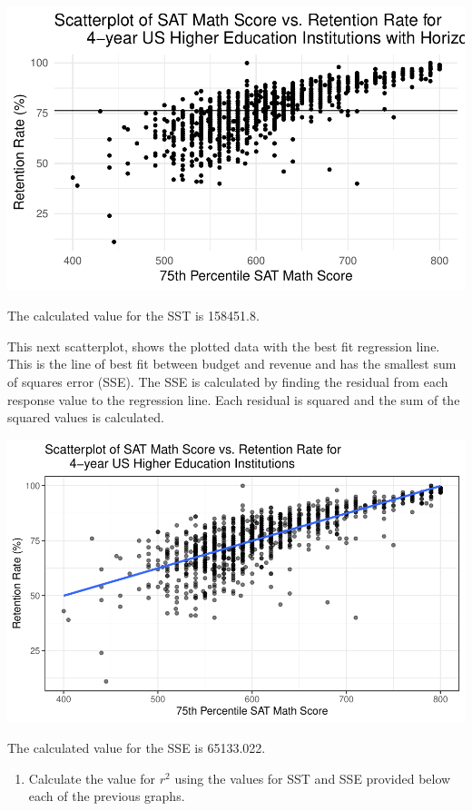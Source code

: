 \documentclass[
]{report}
\providecommand{\tightlist}{%
  \setlength{\itemsep}{0pt}\setlength{\parskip}{0pt}}
\begin{document}
\begin{center}\includegraphics[width=0.7\linewidth]{13-A27-EDA-two-quantitative-corr_files/figure-latex/unnamed-chunk-5-1} \end{center}

The calculated value for the SST is 158451.8.

This next scatterplot, shows the plotted data with the best fit regression line. This is the line of best fit between budget and revenue and has the smallest sum of squares error (SSE). The SSE is calculated by finding the residual from each response value to the regression line. Each residual is squared and the sum of the squared values is calculated.

\begin{center}\includegraphics[width=0.7\linewidth]{13-A27-EDA-two-quantitative-corr_files/figure-latex/unnamed-chunk-6-1} \end{center}

The calculated value for the SSE is 65133.022.

\begin{enumerate}
\def\labelenumi{\arabic{enumi}.}
\setcounter{enumi}{7}
\tightlist
\item
  Calculate the value for \(r^2\) using the values for SST and SSE provided below each of the previous graphs.
\end{enumerate}
\end{document}
